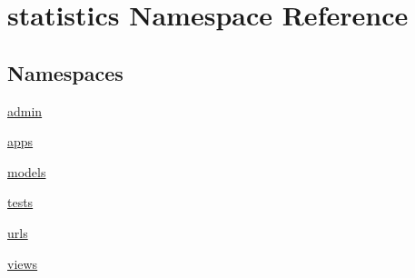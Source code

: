 \hypertarget{namespacestatistics}{}\section{statistics Namespace Reference}
\label{namespacestatistics}
\subsection*{Namespaces}
\begin{DoxyCompactItemize}
\item 
 \hyperlink{namespacestatistics_1_1admin}{admin}
\item 
 \hyperlink{namespacestatistics_1_1apps}{apps}
\item 
 \hyperlink{namespacestatistics_1_1models}{models}
\item 
 \hyperlink{namespacestatistics_1_1tests}{tests}
\item 
 \hyperlink{namespacestatistics_1_1urls}{urls}
\item 
 \hyperlink{namespacestatistics_1_1views}{views}
\end{DoxyCompactItemize}
